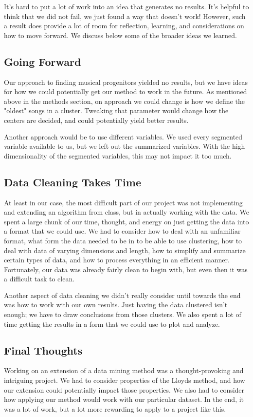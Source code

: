 It's hard to put a lot of work into an idea that generates no results.
It's helpful to think that we did not fail, we just found a way that doesn't work!
However, such a result does provide a lot of room for reflection, learning, and considerations on how to move forward.
We discuss below some of the broader ideas we learned.

\subsection{Going Forward}

Our approach to finding musical progenitors yielded no results,
but we have ideas for how we could potentially get our method to work in the future.
As mentioned above in the methods section,
on approach we could change is how we define the "oldest" songs in a cluster.
Tweaking that parameter would change how the centers are decided, and could potentially yield better results.

Another approach would be to use different variables.
We used every segmented variable available to us, but we left out the summarized variables.
With the high dimensionality of the segmented variables, this may not impact it too much.


\subsection{Data Cleaning Takes Time}

At least in our case, the most difficult part of our project was not implementing and extending an algorithm
from class, but in actually working with the data.
We spent a large chunk of our time, thought,
and energy on just getting the data into a format that we could use.
We had to consider how to deal with an unfamiliar format,
what form the data needed to be in to be able to use clustering,
how to deal with data of varying dimensions and length,
how to simplify and summarize certain types of data,
and how to process everything in an efficient manner.
Fortunately, our data was already fairly clean to begin with,
but even then it was a difficult task to clean.

Another aspect of data cleaning we didn't really consider until towards the end
was how to work with our own results.
Just having the data clustered isn't enough; we have to draw conclusions from those clusters.
We also spent a lot of time getting the results in a form that we could use to plot and analyze.

\subsection{Final Thoughts}

Working on an extension of a data mining method was a thought-provoking and intriguing project.
We had to consider properties of the Lloyds method,
and how our extension could potentially impact those properties.
We also had to consider how applying our method would work with our particular dataset.
In the end, it was a lot of work, but a lot more rewarding to apply to a project like this.
